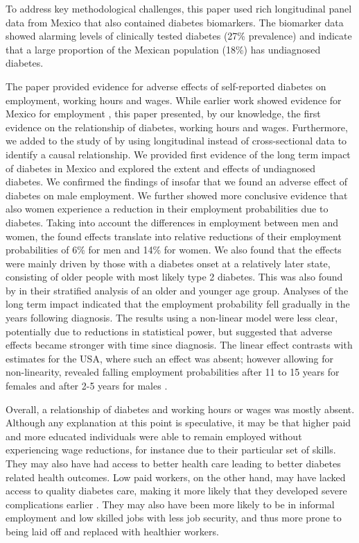 \documentclass[12pt,english]{article}
\begin{document}
To address key methodological challenges, this paper used rich longitudinal panel data from Mexico that also contained diabetes biomarkers. The biomarker data showed alarming levels of clinically tested diabetes (27\% prevalence) and indicate that a large proportion of the Mexican population (18\%) has undiagnosed diabetes.

The paper provided evidence for adverse effects of self-reported diabetes on employment, working hours and wages. While earlier work showed evidence for Mexico for employment \parencite{Seuring2015}, this paper presented, by our knowledge, the first evidence on the relationship of diabetes, working hours and wages. Furthermore, we added to the study of \textcite{Seuring2015} by using longitudinal instead of cross-sectional data to identify a causal relationship. We provided first evidence of the long term impact of diabetes in Mexico and explored the extent and effects of undiagnosed diabetes. We confirmed the findings of \textcite{Seuring2015} insofar that we found an adverse effect of diabetes on male employment. We further showed more conclusive evidence that also women experience a reduction in their employment probabilities due to diabetes. Taking into account the differences in employment between men and women, the found effects translate into relative reductions of their employment probabilities of 6\% for men and 14\% for women. We also found that the effects were mainly driven by those with a diabetes onset at a relatively later state, consisting of older people with most likely type 2 diabetes. This was also found by \textcite{Seuring2015} in their stratified analysis of an older and younger age group. Analyses of the long term impact indicated that the employment probability fell gradually in the years following diagnosis. The results using a non-linear model were less clear, potentially due to reductions in statistical power, but suggested that adverse effects became stronger with time since diagnosis. The linear effect contrasts with estimates for the USA, where such an effect was absent; however allowing for non-linearity, revealed falling employment probabilities after 11 to 15 years for females and after 2-5 years for males \parencite{Minor2013}.

Overall, a relationship of diabetes and working hours or wages was mostly absent. Although any explanation at this point is speculative, it may be that higher paid and more educated individuals were able to remain employed without experiencing wage reductions, for instance due to their particular set of skills. They may also have had access to better health care leading to better diabetes related health outcomes. Low paid workers, on the other hand, may have lacked access to quality diabetes care, making it more likely that they developed severe complications earlier \parencite{Flores-Hernandez2015}. They may also have been more likely to be in informal employment and low skilled jobs with less job security, and thus more prone to being laid off and replaced with healthier workers.
\end{document}
